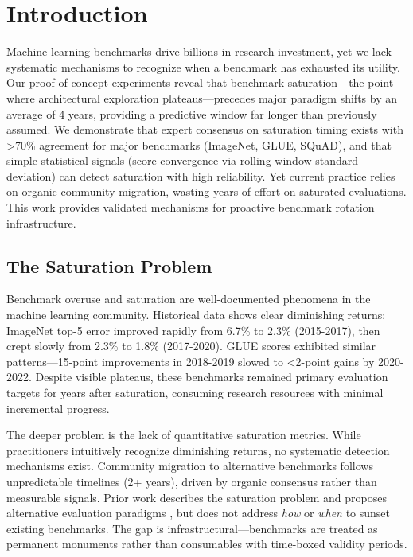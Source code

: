 \section{Introduction}

Machine learning benchmarks drive billions in research investment, yet we lack systematic mechanisms to recognize when a benchmark has exhausted its utility. Our proof-of-concept experiments reveal that benchmark saturation---the point where architectural exploration plateaus---precedes major paradigm shifts by an average of 4 years, providing a predictive window far longer than previously assumed. We demonstrate that expert consensus on saturation timing exists with >70\% agreement for major benchmarks (ImageNet, GLUE, SQuAD), and that simple statistical signals (score convergence via rolling window standard deviation) can detect saturation with high reliability. Yet current practice relies on organic community migration, wasting years of effort on saturated evaluations. This work provides validated mechanisms for proactive benchmark rotation infrastructure.

\subsection{The Saturation Problem}

Benchmark overuse and saturation are well-documented phenomena in the machine learning community. Historical data shows clear diminishing returns: ImageNet top-5 error improved rapidly from 6.7\% to 2.3\% (2015-2017), then crept slowly from 2.3\% to 1.8\% (2017-2020). GLUE scores exhibited similar patterns---15-point improvements in 2018-2019 slowed to <2-point gains by 2020-2022. Despite visible plateaus, these benchmarks remained primary evaluation targets for years after saturation, consuming research resources with minimal incremental progress.

The deeper problem is the lack of quantitative saturation metrics. While practitioners intuitively recognize diminishing returns, no systematic detection mechanisms exist. Community migration to alternative benchmarks follows unpredictable timelines (2+ years), driven by organic consensus rather than measurable signals. Prior work describes the saturation problem and proposes alternative evaluation paradigms \cite{Hendrycks2019Robustness}, but does not address \emph{how} or \emph{when} to sunset existing benchmarks. The gap is infrastructural---benchmarks are treated as permanent monuments rather than consumables with time-boxed validity periods.

